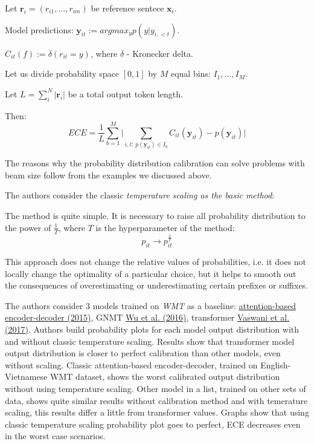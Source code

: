 \documentclass[a4paper,14pt]{extarticle}
\newcommand{\bibref}[3]{\hyperlink{#1}{#2 (#3)}}
\begin{document}
	Let $\mathbf{r}_i = (r_{i1}, \dots, r_{im})$ be reference sentece $\mathbf{x}_i$.
	
	Model predictions: $\mathbf{y}_{it} := argmax_{y} p(y | y_{i, <t})$.
	
	$C_{it}(f) := \delta(r_{it} = y)$, where $\delta$ - Kronecker delta.
	
	Let us divide probability space $[0, 1]$ by $M$ equal bins: $I_1, \dots, I_M$.
	
	Let $L = \sum_i^N |\mathbf{r}_i|$ be a total output token length.
	
	Then:
	\begin{equation}
		ECE = \frac1{L}\sum_{b=1}^{M}\Big|\sum_{i, t:\, p(\mathbf{y}_{it}) \in I_b} C_{it}(\mathbf{y}_{it}) - p(\mathbf{y}_{it})\Big|
	\end{equation}
	
	The reasons why the probability distribution calibration can solve problems with beam size follow from the examples we discussed above.
	
	The authors consider the classic \textit{temperature scaling as the basic method}:
	
	The method is quite simple. It is necessary to raise all probability distribution to the power of $\frac1{T}$, where $T$ is the hyperparameter of the method:
	\[
		p_{it} \rightarrow p_{it}^{\frac1{T}}
	\]
	
	This approach does not change the relative values of probabilities, i.e. it does not locally change the optimality of a particular choice, but it helps to smooth out the consequences of overestimating or underestimating certain prefixes or suffixes.
	
	The authors consider 3 models trained on \textit{WMT} as a baseline: \bibref{encdec_att}{attention-based encoder-decoder}{2015}, GNMT \bibref{gnmt}{Wu et al.}{2016}, transformer \bibref{transformer}{Vaswani et al.}{2017}. Authors build probability plots for each model output distribution with and without classic temperature scaling. Results show that transformer model output distribution is closer to perfect calibration than other models, even without scaling. Classic attention-based encoder-decoder, trained on English-Vietnamese WMT dataset, shows the worst calibrated output distribution without using temperature scaling. Other model in a list, trained on other sets of data, shows quite similar results without calibration method and with temerature scaling, this results differ a little from transformer values. Graphs show that using classic temperature scaling probability plot goes to perfect, ECE decreases even in the worst case scenarios. 
	
\end{document}
